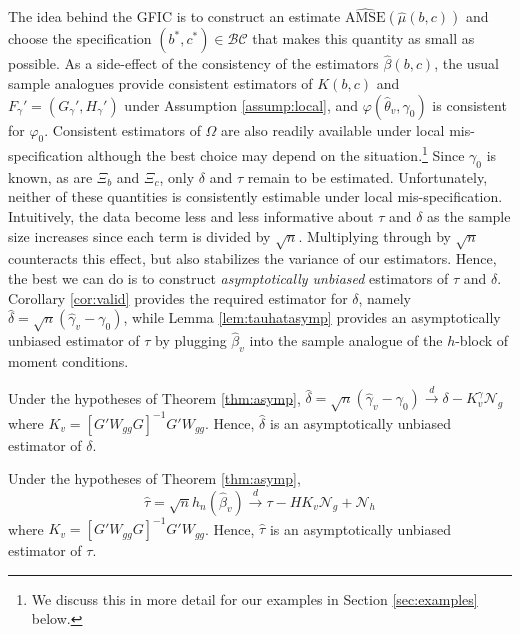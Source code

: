 The idea behind the GFIC is to construct an estimate $\widehat{\mbox{AMSE}}\left(\widehat{\mu}(b,c)\right)$ and choose the specification $(b^*,c^*)\in\mathcal{BC}$ that makes this quantity as small as possible. 
As a side-effect of the consistency of the estimators $\widehat{\beta}(b,c)$, the usual sample analogues provide consistent estimators of $K(b,c)$ and $F_{\gamma}' = (G_\gamma', H_\gamma')$ under Assumption \ref{assump:local}, and $\varphi(\widehat{\theta}_v,\gamma_0)$ is consistent for $\varphi_0$. 
Consistent estimators of $\Omega$ are also readily available under local mis-specification although the best choice may depend on the situation.\footnote{We discuss this in more detail for our examples in Section \ref{sec:examples} below.}
Since $\gamma_0$ is known, as are $\Xi_b$ and $\Xi_c$, only $\delta$ and $\tau$ remain to be estimated. 
Unfortunately, neither of these quantities is consistently estimable under local mis-specification. 
Intuitively, the data become less and less informative about $\tau$ and $\delta$ as the sample size increases since each term is divided by $\sqrt{n}$. 
Multiplying through by $\sqrt{n}$ counteracts this effect, but also stabilizes the variance of our estimators. 
Hence, the best we can do is to construct \emph{asymptotically unbiased} estimators of $\tau$ and $\delta$. 
Corollary \ref{cor:valid} provides the required estimator for $\delta$, namely $\widehat{\delta} = \sqrt{n}\left(\widehat{\gamma}_v - \gamma_0\right)$, while Lemma \ref{lem:tauhatasymp} provides an asymptotically unbiased estimator of $\tau$ by plugging $\widehat{\beta}_v$ into the sample analogue of the $h$-block of moment conditions.

\begin{cor} 
\label{cor:deltahat}
Under the hypotheses of Theorem \ref{thm:asymp},
	$\widehat{\delta} = \sqrt{n}\left(\widehat{\gamma}_v - \gamma_0\right) \overset{d}{\rightarrow} \delta - K_{v}^{\gamma} \mathscr{N}_g$
where 
$K_v = \left[G'W_{gg}G\right]^{-1}G'W_{gg}$.
Hence, $\widehat{\delta}$ is an asymptotically unbiased estimator of $\delta$.
\end{cor} 

\begin{lem}
\label{lem:tauhatasymp}
Under the hypotheses of Theorem \ref{thm:asymp},
	$$\widehat{\tau} = \sqrt{n}h_n\left(\widehat{\beta}_v\right) \overset{d}{\rightarrow} \tau - HK_v \mathscr{N}_g + \mathscr{N}_h$$
where $K_v = \left[G'W_{gg}G\right]^{-1}G'W_{gg}$. Hence, $\widehat{\tau}$ is an asymptotically unbiased estimator of $\tau$.
\end{lem}

